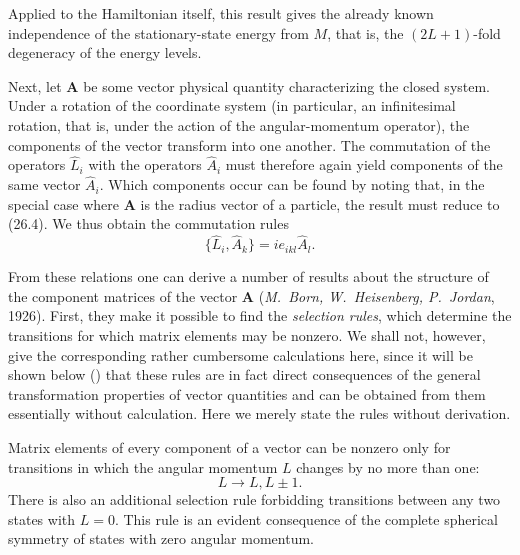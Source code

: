 Applied to the Hamiltonian itself, this result gives the already known
independence of the stationary-state energy from $M$, that is, the
$(2L+1)$-fold degeneracy of the energy levels.

Next, let $\mathbf A$ be some vector physical quantity characterizing the
closed system. Under a rotation of the coordinate system (in particular, an
infinitesimal rotation, that is,
under the action of the angular-momentum operator), the components of the
vector transform into one another. The commutation of the operators
$\hat L_i$ with the operators $\hat A_i$ must therefore again yield components
of the same vector $\hat A_i$. Which components occur can be found by noting
that, in the special case where $\mathbf A$ is the radius vector of a
particle, the result must reduce to (26.4). We thus obtain the commutation
rules
\begin{equation}
  \{\hat L_i,\hat A_k\}=ie_{ikl}\hat A_l.
  \tag{29.4}
\end{equation}

From these relations one can derive a number of results about the structure
of the component matrices of the vector $\mathbf A$
(\emph{M.~Born, W.~Heisenberg, P.~Jordan}, 1926). First, they make it possible
to find the \emph{selection rules}, which determine the transitions for which
matrix elements may be nonzero. We shall not, however, give the corresponding
rather cumbersome calculations here, since it will be shown below
() that these rules are in fact direct consequences of the general
transformation properties of vector quantities and can be obtained from them
essentially without calculation. Here we merely state the rules without
derivation.

Matrix elements of every component of a vector can be nonzero only for
transitions in which the angular momentum $L$ changes by no more than one:
\begin{equation}
  L\to L,L\pm1.
  \tag{29.5}
\end{equation}
There is also an additional selection rule forbidding transitions between
any two states with $L=0$. This rule is an evident consequence of the complete
spherical symmetry of states with zero angular momentum.

